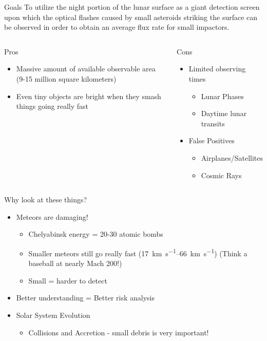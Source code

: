 \documentclass[pdf]{beamer}
\begin{document}
\begin{frame}{Goals}
  To utilize the night portion of the lunar surface as a giant detection screen upon which the optical flashes caused by small asteroids striking the surface can be observed in order to obtain an average flux rate for small impactors.
  \begin{columns}
	\begin{block}{Pros}
	  \begin{itemize}
		\item Massive amount of available observable area (9-15 million square kilometers)
		\item Even tiny objects are bright when they smash things going really fast
	  \end{itemize}
	\end{block}
	\begin{block}{Cons}
	  \begin{itemize}
		\item Limited observing times
		  \begin{itemize}
			\item Lunar Phases
			\item Daytime lunar transits
		  \end{itemize}
		\item False Positives
		  \begin{itemize}
			\item Airplanes/Satellites
			\item Cosmic Rays
		  \end{itemize}
	  \end{itemize}
	\end{block}
  \end{columns}
\end{frame}

\begin{frame}{Why look at these things?}
  \begin{itemize}
	\item Meteors are damaging!
	  \begin{itemize}
		\item Chelyabinsk energy = 20-30 atomic bombs
		\item Smaller meteors still go really fast (\SIrange{17}{66}{\kilo\meter\per\second}) (Think a baseball at nearly Mach 200!)
		\item Small = harder to detect
	  \end{itemize}
	\item Better understanding = Better risk analysis
	\item Solar System Evolution
	  \begin{itemize}
		\item Collisions and Accretion - small debris is very important!
	  \end{itemize}
  \end{itemize}
\end{frame}
\end{document}
